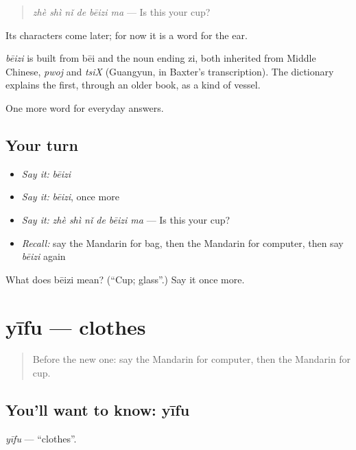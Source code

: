 \begin{quote}
\emph{zhè shì nǐ de bēizi ma} — Is this your cup?
\end{quote}

Its characters come later; for now it is a word for the ear.

\begin{cousinweb}
\emph{bēizi} is built from bēi and the noun ending zi, both inherited from Middle Chinese, \emph{pwoj} and \emph{tsiX} (Guangyun, in Baxter's transcription). The dictionary explains the first, through an older book, as a kind of vessel.
\end{cousinweb}

\begin{grammarlens}[title={What you've built}]
One more word for everyday answers.
\end{grammarlens}

\subsection*{Your turn}
\begin{itemize}
\raggedright
  \item \emph{Say it:} \emph{bēizi}
  \item \emph{Say it:} \emph{bēizi}, once more
  \item \emph{Say it:} \emph{zhè shì nǐ de bēizi ma} — Is this your cup?
  \item \emph{Recall:} say the Mandarin for bag, then the Mandarin for computer, then say \emph{bēizi} again
\end{itemize}

\begin{tcolorbox}[breakable,colback=teal!4,colframe=teal!35!black,title={Before you move on}]
What does bēizi mean? (\textquotedblleft{}Cup; glass\textquotedblright{}.) Say it once more.
\end{tcolorbox}
\section[yīfu]{yīfu — clothes}

\label{lesson:ZH-C58-yifu}



\begin{quote}
Before the new one: say the Mandarin for computer, then the Mandarin for cup.
\end{quote}

\subsection*{You'll want to know: yīfu}
\emph{yīfu} — \textquotedblleft{}clothes\textquotedblright{}.

